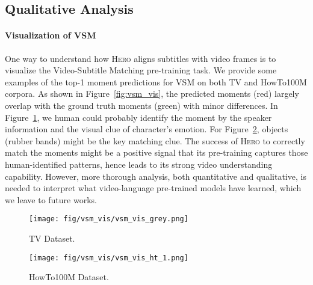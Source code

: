 \documentclass[11pt,a4paper]{article}
\begin{document}
\subsection{Qualitative Analysis} 

\paragraph{Visualization of VSM}
One way to understand how \textsc{Hero} aligns subtitles with video frames is to visualize the Video-Subtitle Matching pre-training task.
We provide some examples of the top-1 moment predictions for VSM on both TV and HowTo100M corpora.
As shown in Figure~\ref{fig:vsm_vis}, the predicted moments (red) largely overlap with the ground truth moments (green) with minor differences. 
In Figure~\ref{subfig:vsm_tv}, we human could probably identify the moment by the speaker information and the visual clue of character's emotion.
For Figure~\ref{subfig:vsm_ht100m}, objects (rubber bands) might be the key matching clue.
The success of \textsc{Hero} to correctly match the moments might be a positive signal that its pre-training captures those human-identified patterns, hence leads to its strong video understanding capability.
However, more thorough analysis, both quantitative and qualitative, is needed to interpret what video-language pre-trained models have learned, which we leave to future works.
\begin{figure*}[t!]
     \centering

     \begin{subfigure}[b]{\textwidth}
         \centering
         \texttt{[image: fig/vsm\_vis/vsm\_vis\_grey.png]}
         \caption{TV Dataset.}
         \label{subfig:vsm_tv}
     \end{subfigure}

    \begin{subfigure}[b]{\textwidth}
         \centering
         \texttt{[image: fig/vsm\_vis/vsm\_vis\_ht\_1.png]}
         \caption{HowTo100M Dataset.}
         \label{subfig:vsm_ht100m}
     \end{subfigure}
\caption{Visualization of top-1 moment predictions by \textsc{Hero} model for Video-Subtitle Matching on: (a) TV Dataset; and (b) HowTo100M Dataset. Text inside the dashed boxes is the accompany subtitles, with sampled subtitle query highlighted in blue. Groundtruth is highlighted with the green bar under the video frames. Predicted moments are bounded with boxes in red. Best viewed in color.}
\label{fig:vsm_vis}
\end{figure*} 
\end{document}
